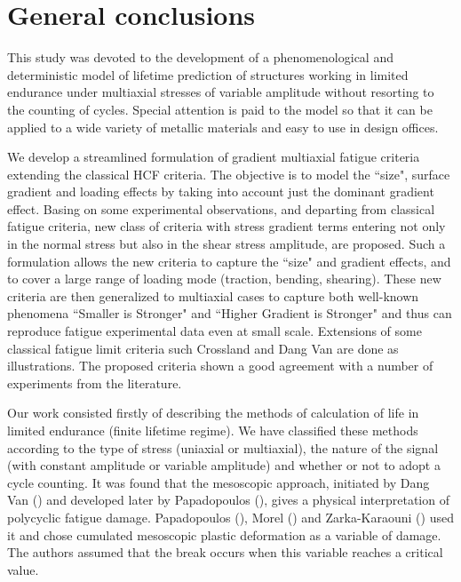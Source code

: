 \chapter{General conclusions}\label{chp:8}
\minitoc
This study was devoted to the development of a phenomenological and deterministic model of lifetime prediction of structures working in limited endurance under multiaxial stresses of variable amplitude without resorting to the counting of cycles. Special attention is paid to the model so that it can be applied to a wide variety of metallic materials and easy to use in design offices.

We develop a streamlined formulation of gradient multiaxial fatigue criteria extending the
classical HCF criteria. The objective is to model the ``size", surface gradient and loading effects by taking into account just the
dominant gradient effect. Basing on some experimental observations, and departing from classical fatigue criteria, new class of
criteria with stress gradient terms entering not only in the normal stress but also in the shear stress
amplitude, are proposed. Such a formulation allows the new criteria to capture the ``size" and gradient
effects, and to cover a large range of loading mode (traction, bending, shearing). These new criteria
are then generalized to multiaxial cases to capture both well-known phenomena ``Smaller is Stronger"
and ``Higher Gradient is Stronger" and thus can reproduce fatigue experimental data even at small scale.
Extensions of some classical fatigue limit criteria such Crossland and Dang Van are done as illustrations.
The proposed criteria shown a good agreement with a number of experiments from the literature. 

Our work consisted firstly of describing the methods of calculation of life in limited endurance (finite lifetime regime). We have classified these methods according to the type of stress (uniaxial or multiaxial), the nature of the signal (with constant amplitude or variable amplitude) and whether or not to adopt a cycle counting. It was found that the mesoscopic approach, initiated by Dang Van (\cite{van1986criterion}) and developed later by Papadopoulos (\cite{papadopoulos2001long}), gives a physical interpretation of polycyclic fatigue damage. Papadopoulos (\cite{papadopoulos2001long}), Morel (\cite{FFE:FFE452}) and Zarka-Karaouni (\cite{de2013comportement}) used it and chose cumulated mesoscopic plastic deformation as a variable of damage. The authors assumed that the break occurs when this variable reaches a critical value.

